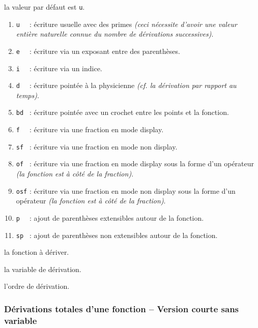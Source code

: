 \documentclass[12pt,a4paper]{article}
\theoremstyle{definition}
\begin{document}
\IDoption{} la valeur par défaut est \verb+u+. 
\begin{enumerate}
	\item \verb+u  + : écriture usuelle avec des primes \emph{(ceci nécessite d'avoir une valeur entière naturelle connue du nombre de dérivations successives)}.

	\item \verb+e  + : écriture via un exposant entre des parenthèses.
	
	\item \verb+i  + : écriture via un indice.

	\item \verb+d  + : écriture pointée à la physicienne \emph{(cf. la dérivation par rapport au temps)}.

	\item \verb+bd + : écriture pointée avec un crochet entre les points et la fonction.

	\medskip
	
	\item \verb+f  + : écriture via une fraction en mode display.

	\item \verb+sf + : écriture via une fraction en mode non display.

	\item \verb+of + : écriture via une fraction en mode display sous la forme d'un opérateur \emph{(la fonction est à côté de la fraction)}.

	\item \verb+osf+ : écriture via une fraction en mode non display sous la forme d'un opérateur \emph{(la fonction est à côté de la fraction)}.

	\medskip
	
	\item \verb+p  + : ajout de parenthèses extensibles autour de la fonction.

	\item \verb+sp + : ajout de parenthèses non extensibles autour de la fonction.
\end{enumerate}


 la fonction à dériver.

 la variable de dérivation.

 l'ordre de dérivation.




\subsubsection{Dérivations totales d'une fonction -- Version courte sans variable} \label{tnsana-short-der}
\end{document}
